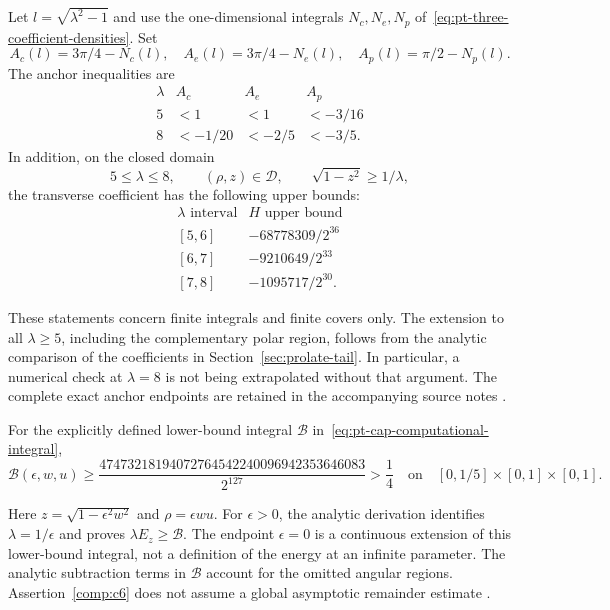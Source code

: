 \begin{computationalassertion}
\label{comp:c5}
Let $l=\sqrt{\lambda^2-1}$ and use the one-dimensional integrals
$N_c,N_e,N_p$ of~\eqref{eq:pt-three-coefficient-densities}.
Set
\[
 A_c(l)=3\pi/4-N_c(l),\quad
 A_e(l)=3\pi/4-N_e(l),\quad
 A_p(l)=\pi/2-N_p(l).
\]
The anchor inequalities are
\[
 \begin{array}{c|ccc}
 \lambda&A_c&A_e&A_p\\ \hline
 5&<1&<1&<-3/16\\
 8&<-1/20&<-2/5&<-3/5.
 \end{array}
\]
In addition, on the closed domain
\[
 5\leq\lambda\leq8,\qquad(\rho,z)\in\mathcal D,\qquad
 \sqrt{1-z^2}\geq1/\lambda,
\]
the transverse coefficient has the following upper bounds:
\[
 \begin{array}{c|c}
 \lambda\text{ interval}&H\text{ upper bound}\\ \hline
 {[5,6]}&-68778309/2^{36}\\
 {[6,7]}&-9210649/2^{33}\\
 {[7,8]}&-1095717/2^{30}.
 \end{array}
\]
\end{computationalassertion}

These statements concern finite integrals and finite covers only.
The extension to all $\lambda\geq5$, including the complementary
polar region, follows from the analytic comparison of the coefficients
in Section~\ref{sec:prolate-tail}.  In particular, a numerical check
at $\lambda=8$ is not being extrapolated without that argument.
The complete exact anchor endpoints are retained in the accompanying
source notes \citep{data-chord}.

\begin{computationalassertion}
\label{comp:c6}
For the explicitly defined lower-bound integral
$\mathcal B$ in~\eqref{eq:pt-cap-computational-integral},
\[
 \mathcal B(\epsilon,w,u)\geq
 \frac{47473218194072764542240096942353646083}{2^{127}}
 >\frac14
 \quad\text{on}\quad
 [0,1/5]\times[0,1]\times[0,1].
\]
\end{computationalassertion}

Here $z=\sqrt{1-\epsilon^2w^2}$ and $\rho=\epsilon wu$.
For $\epsilon>0$, the analytic derivation identifies
$\lambda=1/\epsilon$ and proves $\lambda E_z\geq\mathcal B$.
The endpoint $\epsilon=0$ is a continuous extension of this
lower-bound integral, not a definition of the energy at an infinite
parameter.  The analytic subtraction terms in $\mathcal B$ account
for the omitted angular regions.  Assertion~\ref{comp:c6} does not
assume a global asymptotic remainder estimate \citep{data-cap}.

